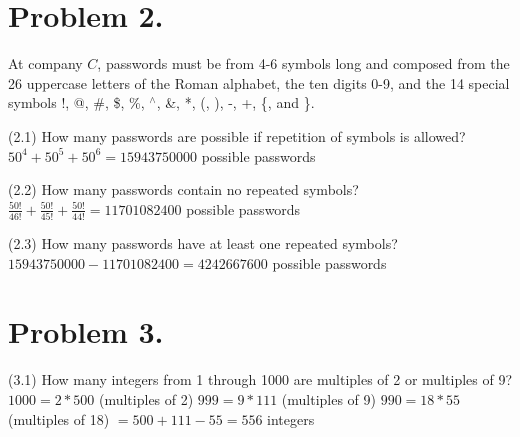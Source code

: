 \documentclass[11pt]{article}
\begin{document}
\section*{Problem 2.}

\noindent
At company $C$, passwords must be from 4-6 symbols long and composed from the
26 uppercase letters of the Roman alphabet, the ten digits 0-9, and the 14
special symbols !, @, \#, \$, \%, $^{\wedge}$, \&, *, (, ), -, +, \{, and \}.
\newline

\noindent
(2.1) How many passwords are possible if repetition of symbols is allowed?
\newline
\newline
\newline
$50^4 + 50^5 + 50^6 = 15943750000$ possible passwords
\newline
\newline
\newline
\newline

\noindent
(2.2) How many passwords contain no repeated symbols?
\newline
\newline
\newline
$\frac{50!}{46!} + \frac{50!}{45!} + \frac{50!}{44!} = 11701082400$ possible passwords
\newline
\newline
\newline
\newline

\noindent
(2.3) How many passwords have at least one repeated symbols?
\newline
\newline
\newline
$15943750000 - 11701082400 = 4242667600$ possible passwords
\newline
\newline
\newline
\newline
\newpage


\section*{Problem 3.}

\noindent
(3.1) How many integers from 1 through 1000 are multiples of 2 or multiples of 9?
\newline
\newline
\newline
$1000 = 2 * 500$ (multiples of 2)
\newline
$999 = 9 * 111$ (multiples of 9)
\newline
$990 = 18 * 55$ (multiples of 18)
\newline
$= 500 + 111 - 55 = 556$ integers
\newline
\newline
\newline
\end{document}
